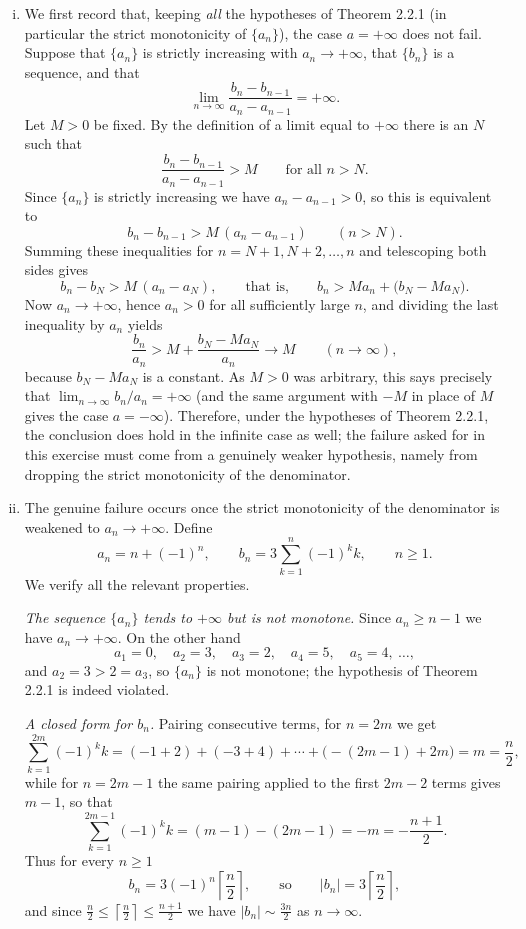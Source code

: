 \documentclass[11pt,a4paper]{article}
\newenvironment{solution}[1]{%
  \par\addvspace{1.7ex}%
  \noindent{\color{solutioncolor}\textbf{#1}}\hspace{0.55em}\ignorespaces}%
  {\par\addvspace{0.9ex}}
\begin{document}
\begin{solution}{Solution 2.2.2}\label{xs:2.2.2}
\begin{enumerate}[(i)]
\item We first record that, keeping \emph{all} the hypotheses of Theorem 2.2.1 (in particular the strict monotonicity of $\{a_n\}$), the case $a=+\infty$ does not fail. Suppose that $\{a_n\}$ is strictly increasing with $a_n\to+\infty$, that $\{b_n\}$ is a sequence, and that
\[
\lim_{n\to\infty}\frac{b_n-b_{n-1}}{a_n-a_{n-1}}=+\infty .
\]
Let $M>0$ be fixed. By the definition of a limit equal to $+\infty$ there is an $N$ such that
\[
\frac{b_n-b_{n-1}}{a_n-a_{n-1}}>M\qquad\text{for all }n>N .
\]
Since $\{a_n\}$ is strictly increasing we have $a_n-a_{n-1}>0$, so this is equivalent to
\[
b_n-b_{n-1}>M\,(a_n-a_{n-1})\qquad(n>N).
\]
Summing these inequalities for $n=N+1,N+2,\dots,n$ and telescoping both sides gives
\[
b_n-b_N>M\,(a_n-a_N),\qquad\text{that is,}\qquad b_n>M a_n+\bigl(b_N-M a_N\bigr).
\]
Now $a_n\to+\infty$, hence $a_n>0$ for all sufficiently large $n$, and dividing the last inequality by $a_n$ yields
\[
\frac{b_n}{a_n}>M+\frac{b_N-M a_N}{a_n}\longrightarrow M\qquad(n\to\infty),
\]
because $b_N-Ma_N$ is a constant. As $M>0$ was arbitrary, this says precisely that $\lim_{n\to\infty}b_n/a_n=+\infty$ (and the same argument with $-M$ in place of $M$ gives the case $a=-\infty$). Therefore, under the hypotheses of Theorem 2.2.1, the conclusion does hold in the infinite case as well; the failure asked for in this exercise must come from a genuinely weaker hypothesis, namely from dropping the strict monotonicity of the denominator.

\item The genuine failure occurs once the strict monotonicity of the denominator is weakened to $a_n\to+\infty$. Define
\[
a_n=n+(-1)^n,\qquad b_n=3\sum_{k=1}^{n}(-1)^k k,\qquad n\ge1 .
\]
We verify all the relevant properties.

\emph{The sequence $\{a_n\}$ tends to $+\infty$ but is not monotone.} Since $a_n\ge n-1$ we have $a_n\to+\infty$. On the other hand
\[
a_1=0,\quad a_2=3,\quad a_3=2,\quad a_4=5,\quad a_5=4,\ \dots,
\]
and $a_2=3>2=a_3$, so $\{a_n\}$ is not monotone; the hypothesis of Theorem 2.2.1 is indeed violated.

\emph{A closed form for $b_n$.} Pairing consecutive terms, for $n=2m$ we get
\[
\sum_{k=1}^{2m}(-1)^k k=(-1+2)+(-3+4)+\cdots+\bigl(-(2m-1)+2m\bigr)=m=\frac{n}{2},
\]
while for $n=2m-1$ the same pairing applied to the first $2m-2$ terms gives $m-1$, so that
\[
\sum_{k=1}^{2m-1}(-1)^k k=(m-1)-(2m-1)=-m=-\frac{n+1}{2}.
\]
Thus for every $n\ge1$
\[
b_n=3(-1)^n\left\lceil\frac{n}{2}\right\rceil,\qquad\text{so}\qquad |b_n|=3\left\lceil\frac{n}{2}\right\rceil ,
\]
and since $\frac{n}{2}\le\left\lceil\frac{n}{2}\right\rceil\le\frac{n+1}{2}$ we have $|b_n|\sim\frac{3n}{2}$ as $n\to\infty$.


\end{enumerate}
\end{solution}
\end{document}

